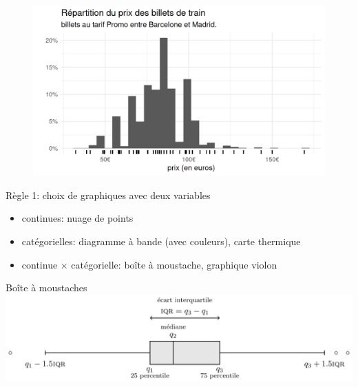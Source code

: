 \documentclass[
  ignorenonframetext,
]{beamer}
\providecommand{\tightlist}{%
  \setlength{\itemsep}{0pt}\setlength{\parskip}{0pt}}\usepackage{longtable,booktabs,array}
\begin{document}
\begin{frame}
\begin{figure}

{\centering \includegraphics{MATH60602-diapos1_files/figure-beamer/renfe_hist-1.png}

}

\end{figure}
\end{frame}

\begin{frame}{Règle 1: choix de graphiques avec deux variables}
\protect\hypertarget{ruxe8gle-1-choix-de-graphiques-avec-deux-variables}{}
\begin{itemize}
\tightlist
\item
  continues: nuage de points
\item
  catégorielles: diagramme à bande (avec couleurs), carte thermique
\item
  continue \(\times\) catégorielle: boîte à moustache, graphique violon
\end{itemize}
\end{frame}

\begin{frame}{Boîte à moustaches}
\protect\hypertarget{bouxeete-uxe0-moustaches}{}
\includegraphics[width=1\textwidth,height=\textheight]{figures/01-intro-boiteamoustache.png}
\end{frame}
\end{document}
